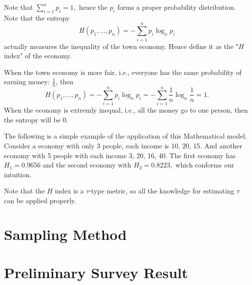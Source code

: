 \documentclass[12pt]{article}%
\begin{document}
Note that $\sum_{i=1}^{n}p_i=1,$ hence the $p_i$ forms a proper probability distribution. Note that the entropy $$H(p_1,\dots,p_n)=-\sum_{i=1}^{n}p_i\log_{n}{p_i}$$ actually measures the 
inequality of the town economy. Hence define it as the "$H$ index" of the economy.

When the town economy is more fair, i.e., everyone has the same probability of earning money: $\frac{1}{n}$, then $$H(p_1,\dots, p_n)=-\sum_{i=1}^{n}p_i\log_{n}{p_i}=-\sum_{i=1}^{n}\frac{1}{n}\log_{n}{\frac{1}{n}}=1.$$ 
When the economy is extremly inequal, i.e., all the money go to one person, then the entropy will be 0.

The following is a simple example of the application of this Mathematical model. Consider a economy with only 3 people, each income is 10, 20, 15. 
And another economy with 5 people with each income  3, 20, 16, 40. The first economy has $H_1=0.9656$ and the second economy with $H_2=0.8223,$ which conforms our intuition.


Note that the $H$ index is a $\tau$-type metric, so all the knowledge for estimating $\tau$ can be applied properly.


\section{Sampling Method}



\section{Preliminary Survey Result}
\end{document}
